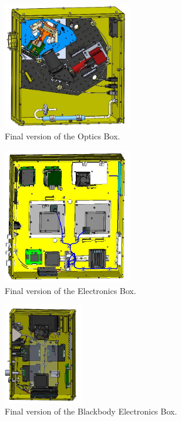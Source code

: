 \begin{figure}
    \centering
    \includegraphics[width=0.5\textwidth]{chap3_images/LIFE_V5_final_images/Optics_Box_final.JPG}
    \caption{Final version of the Optics Box.}
    \label{fig:OBOX_FINAL}
\end{figure}


\begin{figure}
    \centering
    \includegraphics[width=0.5\textwidth]{chap3_images/LIFE_V5_final_images/EBOX_V3_final.JPG}
    \caption{Final version of the Electronics Box.}
    \label{fig:EBOX_FINAL}
\end{figure}

\begin{figure}
    \centering
    \includegraphics[width=0.31\textwidth]{chap3_images/LIFE_V5_final_images/BBEbox_final.JPG}
    \caption{Final version of the Blackbody Electronics Box.}
    \label{fig:BBEBOX_FINAL}
\end{figure}

